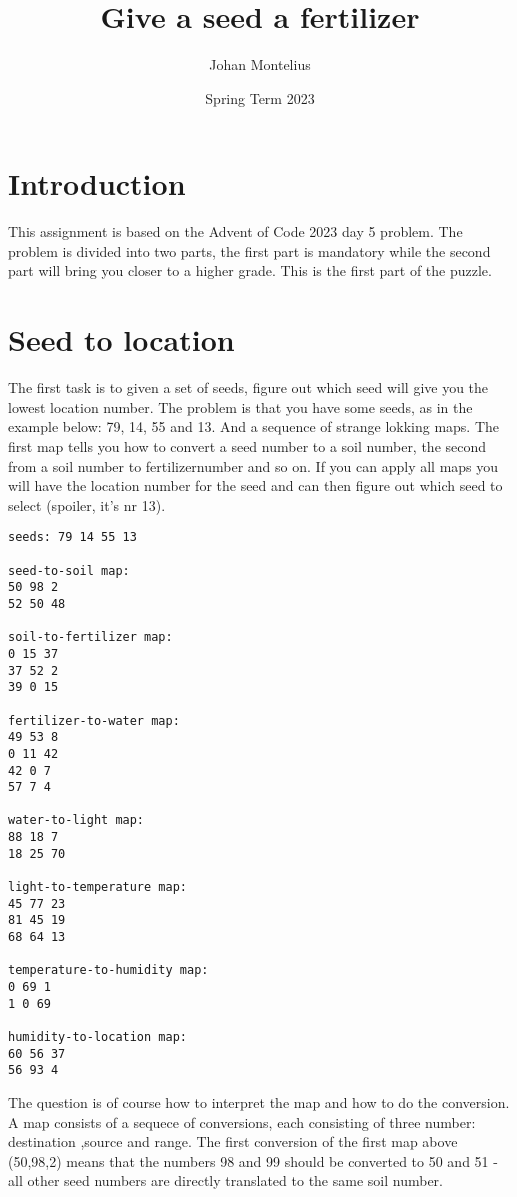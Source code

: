 \documentclass[a4paper,11pt]{article}
\begin{document}
\title{Give a seed a fertilizer}

\author{Johan Montelius}
\date{Spring Term 2023}

\maketitle


\section*{Introduction}

This assignment is based on the Advent of Code 2023 day 5 problem. The
problem is divided into two parts, the first part is mandatory while
the second part will bring you closer to a higher grade. This is the
first part of the puzzle.

\section*{Seed to location}

The first task is to given a set of seeds, figure out which seed will
give you the lowest location number. The problem is that you have some
seeds, as in the example below: 79, 14, 55 and 13. And a sequence of
strange lokking maps. The first map tells you how to convert a seed
number to a soil number, the second from a soil number to
fertilizernumber and so on. If you can apply all maps you will have
the location number for the seed and can then figure out which seed to
select (spoiler, it's nr 13).

\begin{verbatim}
seeds: 79 14 55 13

seed-to-soil map:
50 98 2
52 50 48

soil-to-fertilizer map:
0 15 37
37 52 2
39 0 15

fertilizer-to-water map:
49 53 8
0 11 42
42 0 7
57 7 4

water-to-light map:
88 18 7
18 25 70

light-to-temperature map:
45 77 23
81 45 19
68 64 13

temperature-to-humidity map:
0 69 1
1 0 69

humidity-to-location map:
60 56 37
56 93 4
\end{verbatim}

The question is of course how to interpret the map and how to do the
conversion. A map consists of a sequece of conversions, each
consisting of three number: destination ,source and range. The first
conversion of the first map above (50,98,2) means that the numbers 98
and 99 should be converted to 50 and 51 - all other seed numbers are
directly translated to the same soil number.
\end{document}

